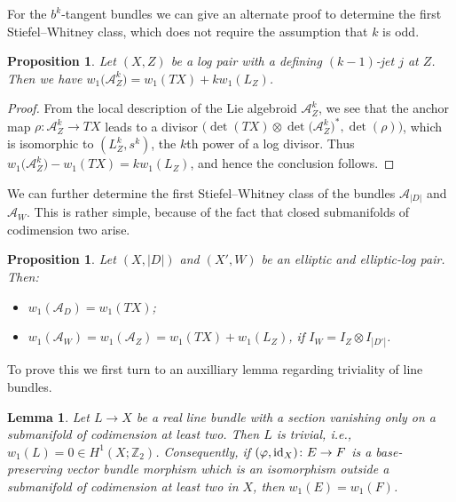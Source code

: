 \documentclass[pdftex]{sigma}
\numberwithin{equation}{section}
\newtheorem{Lemma}[Theorem]{Lemma}
\newtheorem{Proposition}[Theorem]{Proposition}
 { \theoremstyle{definition}
\newtheorem{Definition}[Theorem]{Definition}
\newtheorem{Example}[Theorem]{Example}
\newtheorem{Remark}[Theorem]{Remark} }
\begin{document}
For the $b^k$-tangent bundles we can give an alternate proof to determine the first Stiefel--Whitney class, which does not require the assumption that $k$ is odd.

\begin{Proposition}\label{prop:charclassesbk} Let $(X,Z)$ be a log pair with a defining $(k-1)$-jet $j$ at $Z$. Then we have $w_1\big(\mathcal{A}_Z^k\big) = w_1(TX) + k w_1(L_Z)$.
\end{Proposition}

\begin{proof} From the local description of the Lie algebroid $\mathcal{A}_Z^k$, we see that the anchor map $\rho\colon \mathcal{A}_Z^k \to TX$ leads to a divisor $\big(\det(TX)\otimes\det\big(\mathcal{A}_Z^k\big)^*, \det(\rho)\big)$, which is isomorphic to $(L_Z^k,s^k)$, the $k$th power of a log divisor. Thus $w_1\big(\mathcal{A}_Z^k\big) - w_1(TX) = k w_1(L_Z)$, and hence the conclusion follows.
\end{proof}

We can further determine the first Stiefel--Whitney class of the bundles $\mathcal{A}_{|D|}$ and $\mathcal{A}_W$. This is rather simple, because of the fact that closed submanifolds of codimension two arise.

\begin{Proposition}\label{prop:ellelllogw1} Let $(X,|D|)$ and $(X',W)$ be an elliptic and elliptic-log pair. Then:
	\begin{itemize}\itemsep=0pt
	\item $w_1(\mathcal{A}_D) = w_1(TX)$;
	\item $w_1(\mathcal{A}_W) = w_1(\mathcal{A}_Z) = w_1(TX) + w_1(L_{Z})$, if $I_W = I_{Z} \otimes I_{|D'|}$.
	\end{itemize}
\end{Proposition}

To prove this we first turn to an auxilliary lemma regarding triviality of line bundles.

\begin{Lemma}\label{lem:bundletriviality} Let $L \to X$ be a real line bundle with a section vanishing only on a submanifold of codimension at least two. Then $L$ is trivial, i.e., $w_1(L) = 0 \in H^1(X;\mathbb{Z}_2)$. Consequently, if $(\varphi,{\rm id}_X)\colon E \to F$ is a base-preserving vector bundle morphism which is an isomorphism outside a submanifold of codimension at least two in $X$, then $w_1(E) = w_1(F)$.
\end{Lemma}
\end{document}
